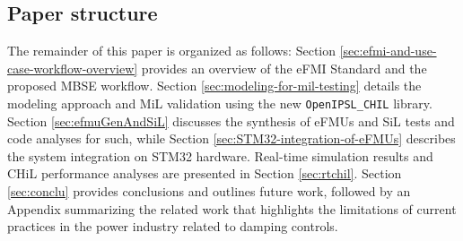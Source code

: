 \subsection{Paper structure}

The remainder of this paper is organized as follows: Section \ref{sec:efmi-and-use-case-workflow-overview} provides an overview of the eFMI Standard and the proposed MBSE workflow. Section \ref{sec:modeling-for-mil-testing} details the modeling approach and MiL validation using the new \texttt{OpenIPSL\_CHIL} library. Section \ref{sec:efmuGenAndSiL} discusses the synthesis of eFMUs and SiL tests and code analyses for such, while Section \ref{sec:STM32-integration-of-eFMUs} describes the system integration on STM32 hardware. Real-time simulation results and CHiL performance analyses are presented in Section \ref{sec:rtchil}. Section \ref{sec:conclu} provides conclusions and outlines future work, followed by an Appendix summarizing the related work that highlights the limitations of current practices in the power industry related to damping controls.
